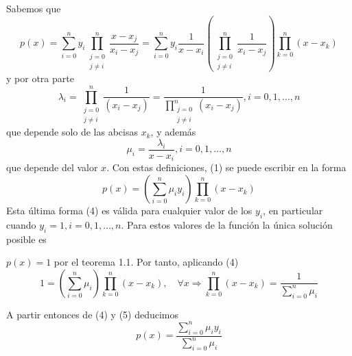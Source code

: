 \begin{frame}
	Sabemos que
	$$
		p(x)=\sum_{i=0}^n y_i \prod_{\substack{j=0 \\ j \neq i}}^n \frac{x-x_j}{x_i-x_j}=\sum_{i=0}^n y_i \frac{1}{x-x_i}\left(\prod_{\substack{j=0 \\ j \neq i}}^n \frac{1}{x_i-x_j}\right) \prod_{k=0}^n\left(x-x_k\right)
	$$
	y por otra parte
	$$
		\lambda_i=\prod_{\substack{j=0 \\ j \neq i}}^n \frac{1}{\left(x_i-x_j\right)}=\frac{1}{\prod_{\substack{j=0 \\ j \neq i}}^n\left(x_i-x_j\right)}, i=0,1, \ldots, n
	$$
	que depende solo de las abcisas $x_k$, y además
	$$
		\mu_i=\frac{\lambda_i}{x-x_i}, i=0,1, \ldots, n
	$$
	que depende del valor $x$. Con estas definiciones, (1) se puede escribir en la forma
	$$
		p(x)=\left(\sum_{i=0}^n \mu_i y_i\right) \prod_{k=0}^n\left(x-x_k\right)
	$$
	Esta última forma (4) es válida para cualquier valor de los $y_i$, en particular cuando $y_{i}=1, i=0,1, \ldots, n$. Para estos valores de la función la única solución posible es

	$p(x)=1$ por el teorema 1.1. Por tanto, aplicando (4)
	$$
		1=\left(\sum_{i=0}^n \mu_i\right) \prod_{k=0}^n\left(x-x_k\right), \quad \forall x \Longrightarrow \prod_{k=0}^n\left(x-x_k\right)=\frac{1}{\sum_{i=0}^n \mu_i}
	$$
\end{frame}

\begin{frame}
	A partir entonces de (4) y (5) deducimos
	$$
		p(x)=\frac{\sum_{i=0}^n \mu_i y_i}{\sum_{i=0}^n \mu_i}
	$$
\end{frame}